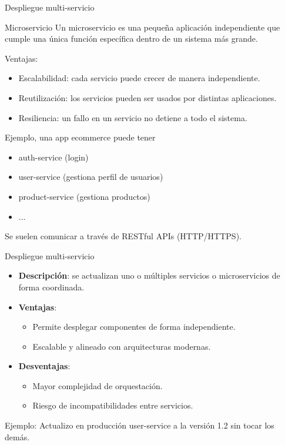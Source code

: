 \documentclass{beamer}
\begin{document}
\begin{frame}{Despliegue multi-servicio}

\begin{block}{Microservicio}
Un microservicio es una pequeña aplicación independiente que cumple una única función específica dentro de un sistema más grande.
\end{block}

Ventajas:

\begin{itemize}
            \item Escalabilidad: cada servicio puede crecer de manera independiente.
            \item Reutilización: los servicios pueden ser usados por distintas aplicaciones.
            \item Resiliencia: un fallo en un servicio no detiene a todo el sistema.
\end{itemize}

Ejemplo, una app ecommerce puede tener

\begin{itemize}
    \item auth-service (login)
    \item user-service (gestiona perfil de usuarios)
    \item product-service (gestiona productos)
    \item ...
\end{itemize}

Se suelen comunicar a través de RESTful APIs (HTTP/HTTPS).

\end{frame}

\begin{frame}{Despliegue multi-servicio}

\begin{itemize}
    \item \textbf{Descripción}: se actualizan uno o múltiples servicios o microservicios de forma coordinada.
    \item \textbf{Ventajas}:
    \begin{itemize}
        \item Permite desplegar componentes de forma independiente.
        \item Escalable y alineado con arquitecturas modernas.
    \end{itemize}
    \item \textbf{Desventajas}:
    \begin{itemize}
        \item Mayor complejidad de orquestación.
        \item Riesgo de incompatibilidades entre servicios.
    \end{itemize}
\end{itemize}

Ejemplo: Actualizo en producción user-service a la versión 1.2 sin tocar los demás.

\end{frame}
\end{document}
